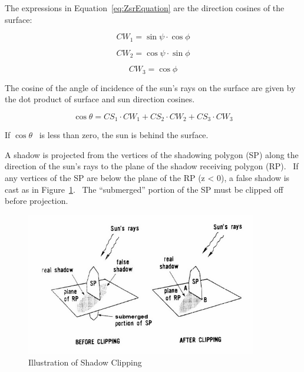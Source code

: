 The expressions in Equation~\ref{eq:ZsrEquation} are the direction cosines of the surface:

\begin{equation}
C{W_1} = \sin \psi \cdot \cos \phi
\end{equation}

\begin{equation}
C{W_2} = \cos \psi \cdot \sin \phi
\end{equation}

\begin{equation}
C{W_3} = \cos \phi
\end{equation}

The cosine of the angle of incidence of the sun's rays on the surface are given by the dot product of surface and sun direction cosines.

\begin{equation}
\cos \theta  = C{S_1}\cdot C{W_1} + C{S_2}\cdot C{W_2} + C{S_3}\cdot C{W_3}
\end{equation}

If \(\cos \theta\) ~is less than zero, the sun is behind the surface.

A shadow is projected from the vertices of the shadowing polygon (SP) along the direction of the sun's rays to the plane of the shadow receiving polygon (RP).~ If any vertices of the SP are below the plane of the RP (z \textless{} 0), a false shadow is cast as in Figure~\ref{fig:illustration-of-shadow-clipping}.~ The ``submerged'' portion of the SP must be clipped off before projection.

\begin{figure}[hbtp] %
\centering
\includegraphics[width=0.9\textwidth, height=0.9\textheight, keepaspectratio=true]{media/image628.png}
\caption{Illustration of Shadow Clipping \protect \label{fig:illustration-of-shadow-clipping}}
\end{figure}

